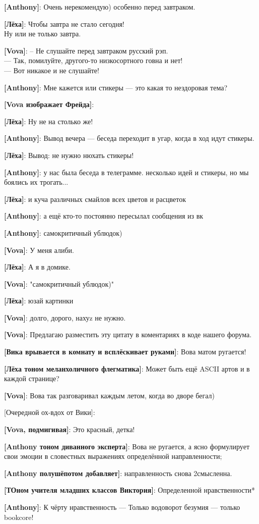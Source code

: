 \begin{flushleft}
\textbf{[Anthony]}: Очень нерекомендую) особенно перед завтраком.

\textbf{[Лёха]}: Чтобы завтра не стало сегодня!\\
Ну или не только завтра.

\textbf{[Vova]}: -- Не слушайте перед завтраком русский рэп.\\
— Так, помилуйте, другого-то низкосортного говна и нет!\\
— Вот никакое и не слушайте!

\textbf{[Anthony]}: Мне кажется или стикеры --- это какая то нездоровая тема?

\textbf{[Vova изображает Фрейда]}: 

\textbf{[Лёха]}: Ну не на столько же!

\textbf{[Anthony]}: Вывод вечера --- беседа переходит в угар, когда в ход идут стикеры.

\textbf{[Лёха]}: Вывод: не нужно нюхать стикеры!

\textbf{[Anthony]}: у нас была беседа в телеграмме. несколько идей и стикеры, но мы боялись их трогать...

\textbf{[Лёха]}: и куча различных смайлов всех цветов и расцветок

\textbf{[Anthony]}: а ещё кто-то постоянно пересылал сообщения из вк

\textbf{[Anthony]}: самокритичный ублюдок)

\textbf{[Vova]}: У меня алиби.

\textbf{[Лёха]}: А я в домике.

\textbf{[Vova]}: "самокритичный ублюдок)"

\textbf{[Лёха]}: юзай картинки

\textbf{[Vova]}: долго, дорого, нахуz не нужно.

\textbf{[Vova]}: Предлагаю разместить эту цитату в коментариях в коде нашего форума.

\textbf{[Вика врывается в комнату и всплёскивает руками]}: Вова матом ругается!

\textbf{[Лёха тоном меланхоличного флегматика]}: Может быть ещё ASCII артов и в каждой странице?

\textbf{[Vova]}: Вова так разговаривал каждым летом, когда во дворе бегал)

[Очередной ох-вдох от Вики]: 

\textbf{[Vova, подмигивая]}: Это красный, детка!

\textbf{[Anthony тоном диванного эксперта]}: Вова не ругается, а ясно формулирует свои эмоции в словестных выражениях определённой направленности;

\textbf{[Anthony полушёпотом добавляет]}: направленность снова 2смысленна.

\textbf{[ТОном учителя младших классов Виктория]}: Определенной нравственности*

\textbf{[Anthony]}: К чёрту нравственность --- Только водоворот безумия --- только bookcore!
\end{flushleft}

